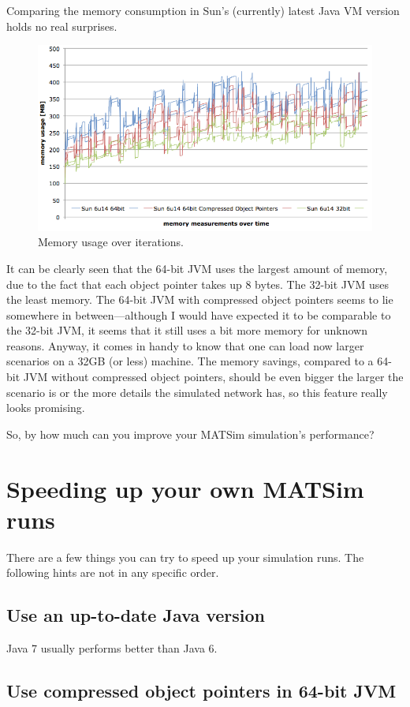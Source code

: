 Comparing the memory consumption in Sun's (currently) latest Java VM version holds no real surprises.
\begin{figure}[h]
\centering
\includegraphics[width=0.75\linewidth]{figures/benchmarks/benchmark_memory}
\caption{Memory usage over iterations.}
\label{fig:Benchmark04}
\end{figure}

It can be clearly seen that the 64-bit JVM uses the largest amount of memory, due to the fact that each object pointer takes up 8 bytes. The 32-bit JVM uses the least memory. The 64-bit JVM with compressed object pointers seems to lie somewhere in between—although I would have expected it to be comparable to the 32-bit JVM, it seems that it still uses a bit more memory for unknown reasons. Anyway, it comes in handy to know that one can load now larger scenarios on a 32GB (or less) machine. The memory savings, compared to a 64-bit JVM without compressed object pointers, should be even bigger the larger the scenario is or the more details the simulated network has, so this feature really looks promising.
 
So, by how much can you improve your MATSim simulation's performance?

\section{Speeding up your own MATSim runs}
There are a few things you can try to speed up your simulation runs. The following hints are not in any specific order.%

\subsection{Use an up-to-date Java version}
Java 7 usually performs better than Java 6.

\subsection{Use compressed object pointers in 64-bit JVM}


